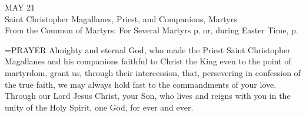 \begin{center}\normalsize MAY 21\\
\footnotesize Saint Christopher Magallanes, Priest, and Companions, Martyrs\\
\footnotesize From the Common of Martyrs: For Several Martyrs p.   or, during Easter Time, p.\\
\end{center}

\hangindent=\parindent \small{PRAYER 
Almighty and eternal God,
who made the Priest Saint Christopher Magallanes and his companions
faithful to Christ the King even to the point of martyrdom,
grant us, through their intercession,
that, persevering in confession of the true faith,
we may always hold fast to the commandments of your love.
Through our Lord Jesus Christ, your Son,
who lives and reigns with you in the unity of the Holy Spirit,
one God, for ever and ever.\\}
 
